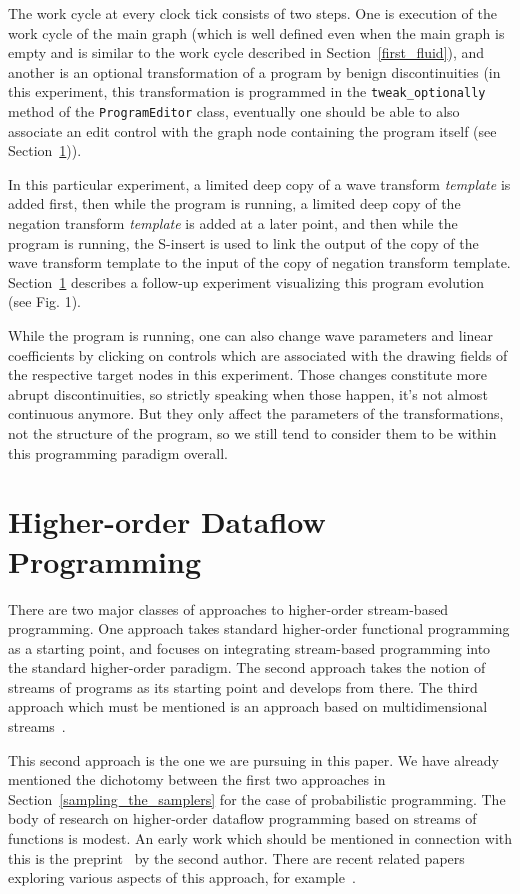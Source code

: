 \documentclass{llncs}
\begin{document}
The work cycle at every clock tick consists of two steps. One is execution of the work cycle
of the main graph (which is well defined even when the main graph is empty and is similar to the
work cycle described in Section~\ref{first_fluid}), and another is
an optional transformation of a program by benign discontinuities (in this experiment,
this transformation is programmed in the {\tt tweak\_optionally} method of the {\tt ProgramEditor}
class, eventually one should be able to also associate an edit control with the graph node containing
the program itself (see Section~\ref{higher})).

In this particular experiment, a limited deep copy of a wave transform {\em template} is added first,
then while the program is running, a limited deep copy of the negation
transform {\em template} is added at a later point, and then while the program is running, the S-insert is used to link
the output of the copy of the wave transform template to the input of the copy of negation transform template.
Section~\ref{higher} describes a follow-up experiment visualizing this program evolution (see Fig. 1).

While the program is running, one can also change wave parameters and linear coefficients by clicking on
controls which are associated with the drawing fields of the respective
target nodes in this experiment. Those changes constitute more abrupt discontinuities, 
so strictly speaking when those happen, it's not almost continuous anymore. 
But they only affect the parameters of the transformations, 
not the structure of the program, so we still tend to consider them to be within this programming paradigm overall.


\section{Higher-order Dataflow Programming}\label{higher}

There are two major classes of approaches to higher-order stream-based programming.
One approach takes standard higher-order functional programming as a starting point,
and focuses on integrating stream-based programming into the standard higher-order paradigm.
The second approach takes the notion of streams of programs as
its starting point and develops from there. The third approach which must be
mentioned is an approach based on multidimensional streams~\cite{WWadge}.

This second approach is the one we are
pursuing in this paper. We have already mentioned the dichotomy between the first two approaches in Section~\ref{sampling_the_samplers}
for the case of probabilistic programming. The body of research on higher-order dataflow
programming based on streams of functions is modest. An early work which should be mentioned
in connection with this is the preprint~\cite{SMatthews} by the second author. There are recent related
papers exploring various aspects of this approach, for example~\cite{NKrishnaswami}.
\end{document}

